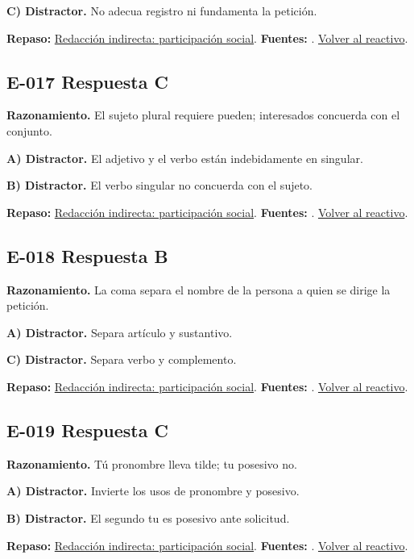 \textbf{C) Distractor. }No adecua registro ni fundamenta la petición.

\textbf{Repaso:} \hyperref[sec:e2]{Redacción indirecta: participación social}. \textbf{Fuentes:} \cite{rae,writing}. \hyperref[q:E-016]{Volver al reactivo}.\par\medskip

\subsection*{E-017 \quad Respuesta C}\label{s:E-017}
\textbf{Razonamiento.} El sujeto plural requiere pueden; interesados concuerda con el conjunto.

\textbf{A) Distractor. }El adjetivo y el verbo están indebidamente en singular.

\textbf{B) Distractor. }El verbo singular no concuerda con el sujeto.

\textbf{Repaso:} \hyperref[sec:e2]{Redacción indirecta: participación social}. \textbf{Fuentes:} \cite{rae,writing}. \hyperref[q:E-017]{Volver al reactivo}.\par\medskip

\subsection*{E-018 \quad Respuesta B}\label{s:E-018}
\textbf{Razonamiento.} La coma separa el nombre de la persona a quien se dirige la petición.

\textbf{A) Distractor. }Separa artículo y sustantivo.

\textbf{C) Distractor. }Separa verbo y complemento.

\textbf{Repaso:} \hyperref[sec:e2]{Redacción indirecta: participación social}. \textbf{Fuentes:} \cite{rae,writing}. \hyperref[q:E-018]{Volver al reactivo}.\par\medskip

\subsection*{E-019 \quad Respuesta C}\label{s:E-019}
\textbf{Razonamiento.} Tú pronombre lleva tilde; tu posesivo no.

\textbf{A) Distractor. }Invierte los usos de pronombre y posesivo.

\textbf{B) Distractor. }El segundo tu es posesivo ante solicitud.

\textbf{Repaso:} \hyperref[sec:e2]{Redacción indirecta: participación social}. \textbf{Fuentes:} \cite{rae,writing}. \hyperref[q:E-019]{Volver al reactivo}.\par\medskip

